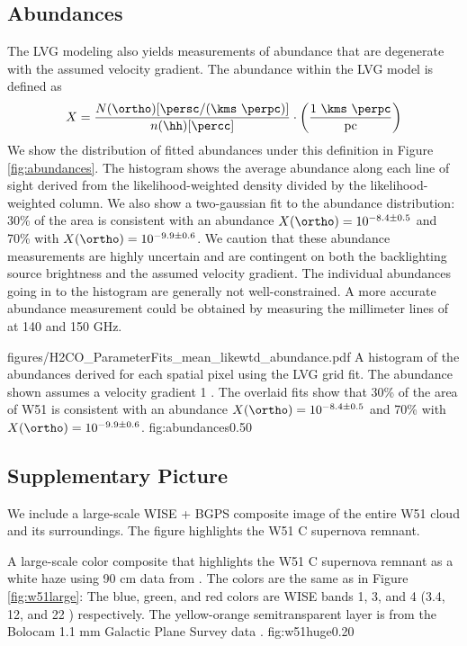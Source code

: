 \subsection{Abundances}
\label{sec:abundance}
The LVG modeling also yields measurements of abundance that are degenerate with
the assumed velocity gradient.  The abundance within the LVG model is defined
as 
\begin{equation}
    X = \frac{N(\ortho) [\persc / (\kms~\perpc)]}{n(\hh) [\percc]}
    \cdot \left(\frac{1~\kms~\perpc}{\mathrm{pc}}\right)
\end{equation}
We show the distribution of fitted abundances under this definition in Figure
\ref{fig:abundances}.  The histogram shows the average abundance along each
line of sight derived from the likelihood-weighted density divided by the
likelihood-weighted column.  We also show a two-gaussian fit to the 
abundance distribution: 30\% of the area is consistent with an abundance
$X(\ortho) = 10^{-8.4 \pm 0.5}$ and 70\% with $X(\ortho) = 10^{-9.9\pm0.6}$.
We caution that these abundance measurements are highly uncertain and are
contingent on both the backlighting source brightness and the assumed velocity
gradient.  The individual abundances going in to the histogram are generally
not well-constrained.  A more accurate abundance measurement could be obtained
by measuring the millimeter lines of \ortho at 140 and 150 GHz.


\Figure
{figures/H2CO_ParameterFits_mean_likewtd_abundance.pdf}
{A histogram of the abundances derived for each spatial pixel using
the LVG grid fit.  The abundance shown assumes a velocity gradient 1 \kms
\perpc.  The overlaid fits show that 30\% of the area of W51 is consistent with
an abundance $X(\ortho) = 10^{-8.4 \pm 0.5}$ and 70\% with $X(\ortho) =
10^{-9.9\pm0.6}$.
}
{fig:abundances}{0.5}{0}


\subsection{Supplementary Picture}
We include a large-scale WISE + BGPS composite image of the entire W51 cloud
and its surroundings.  The figure highlights the W51 C supernova remnant.

{A large-scale color composite that highlights the W51 C supernova remnant as a
white haze using 90 cm data from \citet{Brogan2013a}.
The colors are the same as in Figure \ref{fig:w51large}:
The blue, green, and red colors are WISE bands 1, 3, and 4 (3.4, 12, and 22
\um) respectively.  The yellow-orange semitransparent layer is from the Bolocam
1.1 mm Galactic Plane Survey data \citep{Aguirre2011a,Ginsburg2013a}.
}{fig:w51huge}{0.2}{0}



